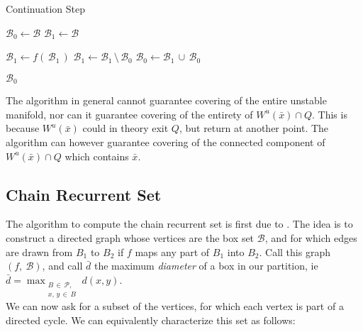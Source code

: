 \begin{algorithm}
    \caption{Continuation Step}
    \label{alg:manifold}

    \begin{algorithmic}[1]
        \State $\mathcal{B}_0 \gets \mathcal{B}$
        \State $\mathcal{B}_1 \gets \mathcal{B}$

            \State $\mathcal{B}_1 \gets f(\,\mathcal{B}_1\,)$
            \State $\mathcal{B}_1 \gets \mathcal{B}_1\, \setminus\, \mathcal{B}_0$
            \State $\mathcal{B}_0 \gets \mathcal{B}_1\, \cup\, \mathcal{B}_0$
        \EndWhile

        \State \Return $\mathcal{B}_0$
    \end{algorithmic}
\end{algorithm}

\begin{proposition}
    \cite*{manifold} The algorithm in general cannot guarantee covering of the 
    entire unstable manifold, nor can it guarantee covering of the entirety of 
    $W^u(\bar{x}) \cap Q$. This is because $W^u(\bar{x})$ could in theory exit $Q$, 
    but return at another point. The algorithm can however guarantee covering 
    of the connected component of $W^u(\bar{x}) \cap Q$ which contains $\bar{x}$.
\end{proposition}
    

\subsection{Chain Recurrent Set}

The algorithm to compute the chain recurrent set is first due to \cite*{chain}. The idea 
is to construct a directed graph whose vertices are the box set $\mathcal{B}$, and for 
which edges are drawn from $B_1$ to $B_2$ if $f$ maps any part of $B_1$ into $B_2$. 
Call this graph $(f,\ \mathcal{B})$, and call $\bar{d}$ the maximum 
\emph{diameter} of a box in our partition, ie 
$\bar{d} = \max_{\substack{B\, \in\, \mathcal{P},\\ x,\, y\, \in\, B}} d(x, y)$.\\ 

We can now ask for a subset of the vertices, for which each vertex is part of a directed cycle. 
We can equivalently characterize this set as follows:

